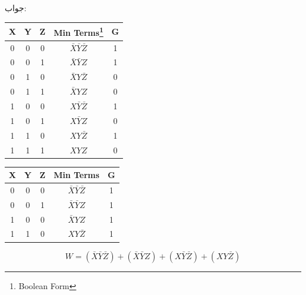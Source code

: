 \documentclass[20pt, a5paper]{article}
\begin{document}
جواب:\\
\begin{LTR}
	\begin{tabular}{ c c c | c | c }		
		X & Y & Z & Min Terms\footnote{Boolean Form} & G \\
		\hline
		  0 & 0  & 0  & $\bar{X} \bar{Y} \bar{Z}$  &1 \\
		  0 & 0  & 1  & $\bar{X} \bar{Y} Z$  &1 \\
		  0 & 1  & 0  & $\bar{X} Y \bar{Z}$  &0 \\
		  0 & 1  & 1  & $\bar{X} Y Z$  &0 \\
		  1 & 0  & 0  & $ X \bar{Y} \bar{Z} $  &1 \\
		  1 & 0  & 1  & $X \bar{Y} Z$  &0 \\
		  1 & 1  & 0  & $X Y \bar{Z}$  &1 \\
		  1 & 1  & 1  & $X Y Z$  &0 \\
	\end{tabular}
\end{LTR}

\hfill \break
\begin{LTR}
	\begin{tabular}{ c c c | c | c }		
		X & Y & Z & Min Terms & G \\
		\hline
		  0 & 0  & 0  & $\bar{X} \bar{Y} \bar{Z}$  &1 \\
		  0 & 0  & 1  & $\bar{X} \bar{Y} Z$  &1 \\
		  1 & 0  & 0  & $\bar{X} Y Z$  &1 \\
		  1 & 1  & 0  & $X Y \bar{Z}$  &1 \\
	\end{tabular}
\end{LTR}

\begin{equation}
	W = (\bar{X} \bar{Y} \bar{Z}) +
	(\bar{X} \bar{Y} Z) +
	(X \bar{Y} \bar{Z}) +
	(X Y \bar{Z})
\end{equation}
\newpage
\end{document}
